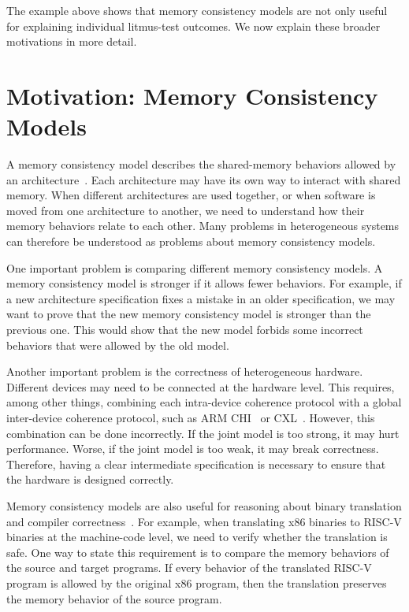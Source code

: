 The example above shows that memory consistency models are not only useful for explaining
individual litmus-test outcomes. We now explain these broader motivations in more detail.

\section{Motivation: Memory Consistency Models}

A memory consistency model describes the shared-memory behaviors allowed by an architecture~\cite{lam1675439,sewell2010x86tso}. Each architecture may have its own way to interact with shared memory. When different architectures are used together, or when software is moved from one architecture to another, we need to understand how their memory behaviors relate to each other. Many problems in heterogeneous systems can therefore be understood as problems about memory consistency models.

One important problem is comparing different memory consistency models. A memory consistency model is stronger if it allows fewer behaviors. For example, if a new architecture specification fixes a mistake in an older specification, we may want to prove that the new memory consistency model is stronger than the previous one. This would show that the new model forbids some incorrect behaviors that were allowed by the old model.

Another important problem is the correctness of heterogeneous hardware. Different devices may need to be connected at the hardware level. This requires, among other things, combining each intra-device coherence protocol with a global inter-device coherence protocol, such as ARM CHI~\cite{arm2021chi} or CXL~\cite{cxl2022}. However, this combination can be done incorrectly. If the joint model is too strong, it may hurt performance. Worse, if the joint model is too weak, it may break correctness. Therefore, having a clear intermediate specification is necessary to ensure that the hardware is designed correctly.

Memory consistency models are also useful for reasoning about binary translation and compiler correctness~\cite{10.1145/2676726.2676995,DennisPhdThesis}. For example, when translating x86 binaries to RISC-V binaries at the machine-code level, we need to verify whether the translation is safe. One way to state this requirement is to compare the memory behaviors of the source and target programs. If every behavior of the translated RISC-V program is allowed by the original x86 program, then the translation preserves the memory behavior of the source program.

